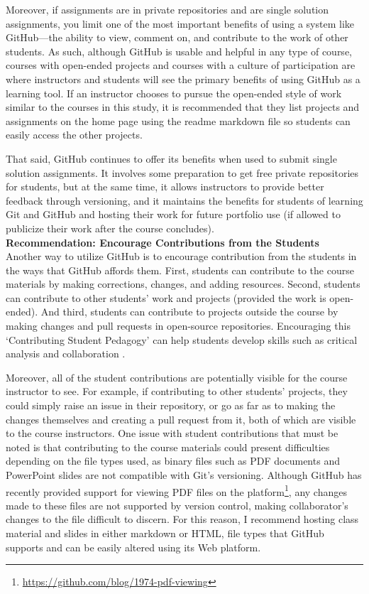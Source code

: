 Moreover, if assignments are in private repositories and are single solution assignments, you limit one of the most important benefits of using a system like GitHub---the ability to view, comment on, and contribute to the work of other students. As such, although GitHub is usable and helpful in any type of course, courses with open-ended projects and courses with a culture of participation are where instructors and students will see the primary benefits of using GitHub as a learning tool. If an instructor chooses to pursue the open-ended style of work similar to the courses in this study, it is recommended that they list projects and assignments on the home page using the readme markdown file so students can easily access the other projects.

That said, GitHub continues to offer its benefits when used to submit single solution assignments. It involves some preparation to get free private repositories for students, but at the same time, it allows instructors to provide better feedback through versioning, and it maintains the benefits for students of learning Git and GitHub and hosting their work for future portfolio use (if allowed to publicize their work after the course concludes). \\

\textbf{Recommendation: Encourage Contributions from the Students} \\
Another way to utilize GitHub is to encourage contribution from the students in the ways that GitHub affords them. First, students can contribute to the course materials by making corrections, changes, and adding resources. Second, students can contribute to other students' work and projects (provided the work is open-ended). And third, students can contribute to projects outside the course by making changes and pull requests in open-source repositories. Encouraging this `Contributing Student Pedagogy' can help students develop skills such as critical analysis and collaboration \cite{falkner2012supporting}.

Moreover, all of the student contributions are potentially visible for the course instructor to see. For example, if contributing to other students' projects, they could simply raise an issue in their repository, or go as far as to making the changes themselves and creating a pull request from it, both of which are visible to the course instructors. One issue with student contributions that must be noted is that contributing to the course materials could present difficulties depending on the file types used, as binary files such as PDF documents and PowerPoint slides are not compatible with Git's versioning. Although GitHub has recently provided support for viewing PDF files on the platform\footnote{\url{https://github.com/blog/1974-pdf-viewing}}, any changes made to these files are not supported by version control, making collaborator's changes to the file difficult to discern. For this reason, I recommend hosting class material and slides in either markdown or HTML, file types that GitHub supports and can be easily altered using its Web platform.

